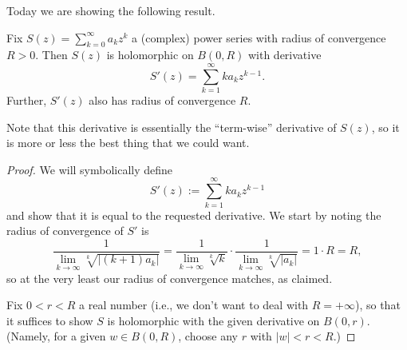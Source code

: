 Today we are showing the following result.
\begin{proposition} \label{prop:powerseriesholo}
	Fix $S(z)=\sum_{k=0}^\infty a_kz^k$ a (complex) power series with radius of convergence $R>0$. Then $S(z)$ is holomorphic on $B(0,R)$ with derivative
	\[S'(z)=\sum_{k=1}^\infty ka_kz^{k-1}.\]
	Further, $S'(z)$ also has radius of convergence $R$.
\end{proposition}
Note that this derivative is essentially the ``term-wise'' derivative of $S(z)$, so it is more or less the best thing that we could want.
\begin{proof}
	We will symbolically define
	\[S'(z):=\sum_{k=1}^\infty ka_kz^{k-1}\]
	and show that it is equal to the requested derivative. We start by noting the radius of convergence of $S'$ is
	\[\frac1{\lim_{k\to\infty}\sqrt[k]{|(k+1)a_k|}}=\frac1{\lim_{k\to\infty}\sqrt[k]k}\cdot\frac1{\lim_{k\to\infty}\sqrt[k]{|a_k|}}=1\cdot R=R,\]
	so at the very least our radius of convergence matches, as claimed.
	
	Fix $0<r<R$ a real number (i.e., we don't want to deal with $R=+\infty$), so that it suffices to show $S$ is holomorphic with the given derivative on $B(0,r)$. (Namely, for a given $w\in B(0,R)$, choose any $r$ with $|w|<r<R$.)
	

\end{proof}
